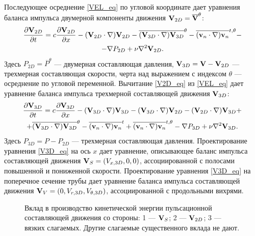 Последующее осреднение \eqref{VEL_eq} по угловой координате дает уравнения баланса импульса двумерной компоненты движения $\mathbf{V}_{2D} = \overline{\mathbf{V}}^\theta$:
\begin{multline} \label{V2D_eq}
\frac{\partial \mathbf{V}_{2D}}{\partial t} = c \frac{\partial \mathbf{V}_{2D}}{\partial x} - (\mathbf{V}_{2D} \cdot \nabla) \mathbf{V}_{2D} - \overline{(\mathbf{V}_{3D} \cdot \nabla) \mathbf{V}_{3D}}^{\theta} - \overline{(\mathbf{v}_n \cdot \nabla) \mathbf{v}_n}^{t,\theta} - \\ - \nabla P_{2D} + \nu \nabla^2 \mathbf{V}_{2D}.
\end{multline}
Здесь $P_{2D} = \overline{P}^{\theta}$ --- двумерная составляющая давления, $\mathbf{V}_{3D} = \mathbf{V} - \mathbf{V}_{2D}$ --- трехмерная составляющая скорости, черта над выражением с индексом $\theta$ --- осреднение по угловой переменной. Вычитание \eqref{V2D_eq} из \eqref{VEL_eq} дает уравнение баланса импульса трехмерной составляющей движения $\mathbf{V}_{3D}$:
\begin{multline} \label{V3D_eq}
\frac{\partial \mathbf{V}_{3D}}{\partial t} = c \frac{\partial \mathbf{V}_{3D}}{\partial x} - (\mathbf{V}_{3D} \cdot \nabla) \mathbf{V}_{3D} - (\mathbf{V}_{3D} \cdot \nabla) \mathbf{V}_{2D} - (\mathbf{V}_{2D} \cdot \nabla) \mathbf{V}_{3D} + \\ + \overline{(\mathbf{V}_{3D} \cdot \nabla) \mathbf{V}_{3D}}^{\theta} - \overline{(\mathbf{v}_n \cdot \nabla) \mathbf{v}_n}^{t} + \overline{(\mathbf{v}_n \cdot \nabla) \mathbf{v}_n}^{t, \theta} - \nabla P_{3D} + \nu \nabla^2 \mathbf{V}_{3D}.
\end{multline}
Здесь $P_{3D} = P - P_{2D}$ --- трехмерная составляющая давления. Проектирование уравнения \eqref{V3D_eq} на ось $x$ дает уравнение, описывающее баланс импульса составляющей движения $\mathbf{V}_S = (V_{x,3D}, 0, 0)$, ассоциированной с полосами повышенной и пониженной скорости. Проектирование уравнения \eqref{V3D_eq} на поперечное сечение трубы дает уравнение баланса импульса составляющей движения $\mathbf{V}_V = (0, V_{r,3D}, V_{\theta,3D})$, ассоциированной с продольными вихрями. 

\begin{figure}
\caption{Вклад в производство кинетической энергии пульсационной составляющей движения со стороны: 1 --- $\mathbf{V}_S$; 2 --- $\mathbf{V}_{2D}$; 3 --- вязких слагаемых. Другие слагаемые существенного вклада не дают.}
\label{e1_parts_pic}
\end{figure}

